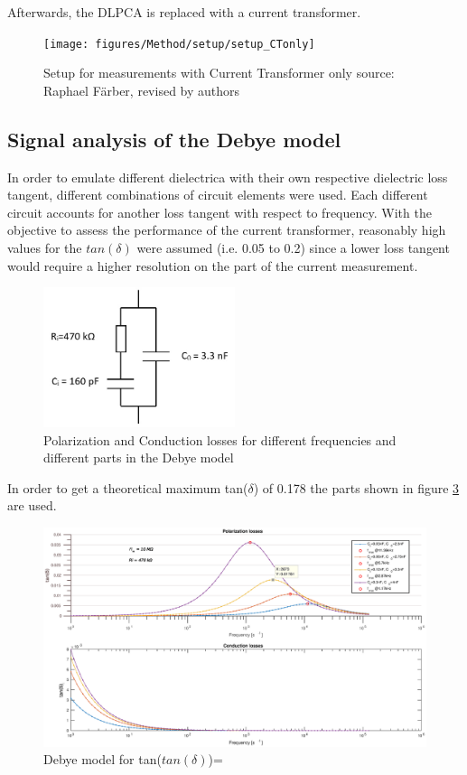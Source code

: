 Afterwards, the DLPCA is replaced with a current transformer. 
\begin{figure}[htbp]
	\centering
	\texttt{[image: figures/Method/setup/setup\_CTonly]}		
	\caption[Kurze Abbildungsbeschreibung]{Setup for measurements with Current Transformer only {source: Raphael F\"arber, revised by authors}} 
	\label{sec.setup }

\end{figure}


\subsection{Signal analysis of the Debye model}

In order to emulate different dielectrica with their own respective dielectric loss tangent, different combinations of circuit elements were used. Each different circuit accounts for another loss tangent with respect to frequency. With the objective to assess the performance of the current transformer, reasonably high values for the $tan\left(\delta\right)$ were assumed (i.e. 0.05 to 0.2) since a lower loss tangent would require a higher resolution on the part of the current measurement.
\begin{figure}
	\includegraphics[width=0.5\textwidth]{figures/Method/debye-modell.jpg}	
	\caption{Polarization and Conduction losses for different frequencies and different parts in the Debye model}	
	\label{fig.debye-modell}
\end{figure}

In order to get a theoretical maximum tan($\delta$) of 0.178 the parts shown in figure \ref{fig.debye-modell} are used. 
\begin{figure}
	\includegraphics[width=\textwidth]{figures/Method/Dielectric_loss/polarizationmultiple.eps}	
	\caption{Debye model for tan($tan(\delta)$)= }	
	\label{fig.debye-modell}
\end{figure}

